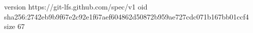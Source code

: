 version https://git-lfs.github.com/spec/v1
oid sha256:2742eb9b9f67e2c92e1f67aef604862d50872b959ae727cdc071b167bb01ccf4
size 67

